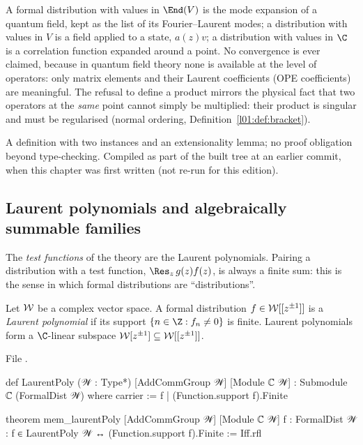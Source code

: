 \begin{physics}
A formal distribution with values in $\End(V)$ is the mode expansion of a quantum field, kept as
the list of its Fourier--Laurent modes; a distribution with values in $V$ is a field applied to a
state, $a(z)v$; a distribution with values in $\C$ is a correlation function expanded around a
point. No convergence is ever claimed, because in quantum field theory none is available at the
level of operators: only matrix elements and their Laurent coefficients (OPE coefficients) are
meaningful. The refusal to define a product mirrors the physical fact that two operators at the
\emph{same} point cannot simply be multiplied: their product is singular and must be regularised
(normal ordering, Definition~\ref{l01:def:bracket}).
\end{physics}

\begin{status}
A definition with two instances and an extensionality lemma; no proof obligation beyond
type-checking. Compiled as part of the built tree at an earlier commit, when this chapter was first written (not re-run for this edition).
\end{status}

\subsection{Laurent polynomials and algebraically summable families}

The \emph{test functions} of the theory are the Laurent polynomials. Pairing a distribution with
a test function, $\Res_z\, g(z)f(z)$, is always a finite sum: this is the sense in which formal
distributions are ``distributions''.

\begin{definition}\label{l01:def:laurent}
Let $\mathcal{W}$ be a complex vector space. A formal distribution $f\in\mathcal{W}[[z^{\pm1}]]$ is a
\emph{Laurent polynomial} if its support $\{n\in\Z : f_n\neq0\}$ is finite. Laurent
polynomials form a $\C$-linear subspace $\mathcal{W}[z^{\pm1}]\subseteq\mathcal{W}[[z^{\pm1}]]$.
\end{definition}

\noindent File .
\begin{leancode}
def LaurentPoly (𝒲 : Type*) [AddCommGroup 𝒲] [Module ℂ 𝒲] : Submodule ℂ (FormalDist 𝒲) where
  carrier := {f | (Function.support f).Finite}

theorem mem_laurentPoly [AddCommGroup 𝒲] [Module ℂ 𝒲] {f : FormalDist 𝒲} :
    f ∈ LaurentPoly 𝒲 ↔ (Function.support f).Finite := Iff.rfl
\end{leancode}

